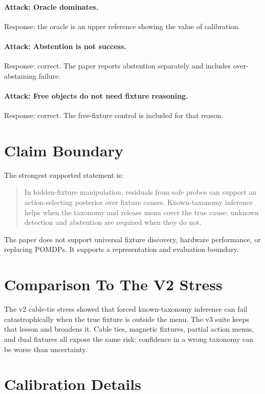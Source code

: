 \documentclass{article}
\begin{document}
\paragraph{Attack: Oracle dominates.}
Response: the oracle is an upper reference showing the value of calibration.

\paragraph{Attack: Abstention is not success.}
Response: correct. The paper reports abstention separately and includes
over-abstaining failure.

\paragraph{Attack: Free objects do not need fixture reasoning.}
Response: correct. The free-fixture control is included for that reason.

\section{Claim Boundary}

The strongest supported statement is:

\begin{quote}
In hidden-fixture manipulation, residuals from safe probes can support an
action-selecting posterior over fixture causes. Known-taxonomy inference helps
when the taxonomy and release menu cover the true cause; unknown detection and
abstention are required when they do not.
\end{quote}

The paper does not support universal fixture discovery, hardware performance,
or replacing POMDPs. It supports a representation and evaluation boundary.

\section{Comparison To The V2 Stress}

The v2 cable-tie stress showed that forced known-taxonomy inference can fail
catastrophically when the true fixture is outside the menu. The v3 suite keeps
that lesson and broadens it. Cable ties, magnetic fixtures, partial action
menus, and dual fixtures all expose the same risk: confidence in a wrong
taxonomy can be worse than uncertainty.

\section{Calibration Details}
\end{document}
